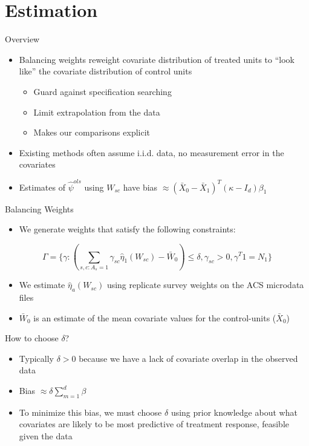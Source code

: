 \documentclass[hyperref={pdfpagelabels=false}]{beamer}
\begin{document}
\section{Estimation}

\begin{frame}{Overview}
    \begin{itemize}
        \item Balancing weights reweight covariate distribution of treated units to ``look like'' the covariate distribution of control units \bigskip
        \begin{itemize}
            \item Guard against specification searching \bigskip
            \item Limit extrapolation from the data \bigskip
            \item Makes our comparisons explicit \bigskip
        \end{itemize}
        \item Existing methods often assume i.i.d. data, no measurement error in the covariates \bigskip
        \item Estimates of $\hat{\psi}^{ols}$ using $W_{sc}$ have bias $\approx (\bar{X}_0 - \bar{X}_1)^T(\kappa - I_d)\beta_1$
    \end{itemize}
\end{frame}

\begin{frame}{Balancing Weights}
    \begin{itemize}
        \item We generate weights that satisfy the following constraints:
    \end{itemize}
    
    $$
    \Gamma = \{\gamma: (\sum_{s,c: A_s = 1}\gamma_{sc}\hat{\eta}_1(W_{sc}) - \bar{W}_0) \le \delta, \gamma_{sc} > 0, \gamma^T1 = N_1\}
    $$
    
    \begin{itemize}
        \item We estimate $\hat{\eta}_a(W_{sc})$ using replicate survey weights on the ACS microdata files \bigskip
        \item $\bar{W}_0$ is an estimate of the mean covariate values for the control-units ($\bar{X}_0$)
    \end{itemize}
\end{frame}

\begin{frame}{How to choose $\delta$?}
    \begin{itemize}
        \item Typically $\delta > 0$ because we have a lack of covariate overlap in the observed data \bigskip
        \item Bias $\approx \delta \sum_{m = 1}^d \beta$ \bigskip
        \item To minimize this bias, we must choose $\delta$ using prior knowledge about what covariates are likely to be most predictive of treatment response, feasible given the data \bigskip
    \end{itemize}
\end{frame}
\end{document}
